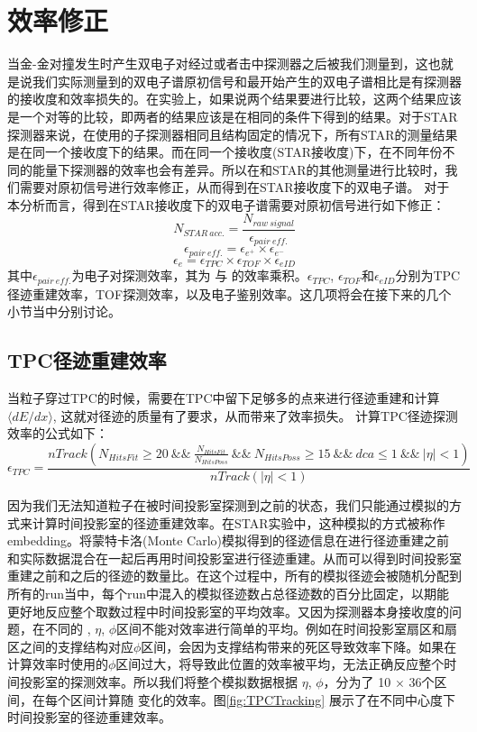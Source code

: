 \section{效率修正}
当金-金对撞发生时产生双电子对经过或者击中探测器之后被我们测量到，这也就是说我们实际测量到的双电子谱原初信号和最开始产生的双电子谱相比是有探测器的接收度和效率损失的。在实验上，如果说两个结果要进行比较，这两个结果应该是一个对等的比较，即两者的结果应该是在相同的条件下得到的结果。对于STAR探测器来说，在使用的子探测器相同且结构固定的情况下，所有STAR的测量结果是在同一个接收度下的结果。而在同一个接收度(STAR接收度)下，在不同年份不同的能量下探测器的效率也会有差异。所以在和STAR的其他测量进行比较时，我们需要对原初信号进行效率修正，从而得到在STAR接收度下的双电子谱。
对于本分析而言，得到在STAR接收度下的双电子谱需要对原初信号进行如下修正：
\begin{equation}
    N_{STAR~acc.} = \frac{ N_{raw~signal} }{ \epsilon_{pair~eff.} }
\end{equation}
\begin{equation}
    \epsilon_{pair~eff.} = \epsilon_{e^{+}}\times\epsilon_{e^{-}}
\end{equation}
\begin{equation}
    \label{eq:single_e}
    \epsilon_{e} = \epsilon_{TPC}\times\epsilon_{TOF}\times\epsilon_{eID}
\end{equation}
其中$\epsilon_{pair~eff.}$为电子对探测效率，其为 \eplus 与 \eminus 的效率乘积。$\epsilon_{TPC}$, $\epsilon_{TOF}$和$\epsilon_{eID}$分别为TPC径迹重建效率，TOF探测效率，以及电子鉴别效率。这几项将会在接下来的几个小节当中分别讨论。

\subsection{TPC径迹重建效率}
当粒子穿过TPC的时候，需要在TPC中留下足够多的点来进行径迹重建和计算 $\langle dE/dx \rangle$, 这就对径迹的质量有了要求，从而带来了效率损失。
计算TPC径迹探测效率的公式如下：
\begin{equation}
    \epsilon_{TPC} = \frac{ nTrack( N_{HitsFit} \geq 20~\&\&~\frac{N_{HitsFit}}{N_{HitsPoss}}~\&\&~N_{HitsPoss}\geq15~\&\&~dca\leq1~\&\&~|\eta| < 1 ) }{nTrack(|\eta| < 1)}
\end{equation}

因为我们无法知道粒子在被时间投影室探测到之前的状态，我们只能通过模拟的方式来计算时间投影室的径迹重建效率。在STAR实验中，这种模拟的方式被称作embedding。将蒙特卡洛(Monte Carlo)模拟得到的径迹信息在进行径迹重建之前和实际数据混合在一起后再用时间投影室进行径迹重建。从而可以得到时间投影室重建之前和之后的径迹的数量比。在这个过程中，所有的模拟径迹会被随机分配到所有的run当中，每个run中混入的模拟径迹数占总径迹数的百分比固定，以期能更好地反应整个取数过程中时间投影室的平均效率。又因为探测器本身接收度的问题，在不同的 \pt , $\eta$, $\phi$区间不能对效率进行简单的平均。例如在时间投影室扇区和扇区之间的支撑结构对应$\phi$区间，会因为支撑结构带来的死区导致效率下降。如果在计算效率时使用的$\phi$区间过大，将导致此位置的效率被平均，无法正确反应整个时间投影室的探测效率。所以我们将整个模拟数据根据 $\eta$, $\phi$，分为了 10 $\times$ 36个区间，在每个区间计算随 \pt 变化的效率。图\ref{fig:TPCTracking} 展示了在不同中心度下时间投影室的径迹重建效率。

